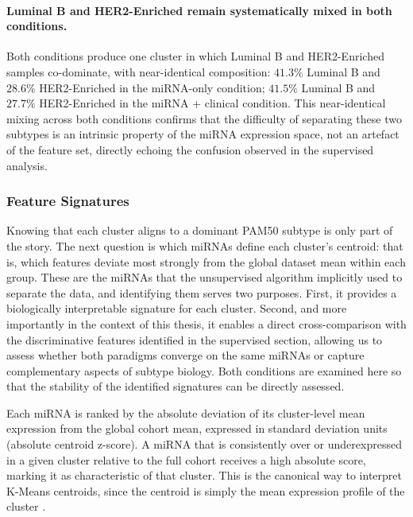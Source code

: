 \paragraph{Luminal B and HER2-Enriched remain systematically mixed in both conditions.}
Both conditions produce one cluster in which Luminal B and HER2-Enriched samples
co-dominate, with near-identical composition: $41.3\%$ Luminal B and $28.6\%$
HER2-Enriched in the miRNA-only condition; $41.5\%$ Luminal B and $27.7\%$
HER2-Enriched in the miRNA + clinical condition. This near-identical mixing across
both conditions confirms that the difficulty of separating these two subtypes is an
intrinsic property of the miRNA expression space, not an artefact of the feature set,
directly echoing the confusion observed in the supervised analysis.

\subsubsection{Feature Signatures}
\label{sec_unsupervised_importance}

Knowing that each cluster aligns to a dominant PAM50 subtype is only part of the story.
The next question is which miRNAs define each cluster's centroid: that is, which features
deviate most strongly from the global dataset mean within each group. These are the
miRNAs that the unsupervised algorithm implicitly used to separate the data, and
identifying them serves two purposes. First, it provides a biologically interpretable
signature for each cluster. Second, and more importantly in the context of this thesis,
it enables a direct cross-comparison with the discriminative features identified in the
supervised section, allowing us to assess whether both paradigms converge on the same
miRNAs or capture complementary aspects of subtype biology. Both conditions are examined
here so that the stability of the identified signatures can be directly assessed.

Each miRNA is ranked by the absolute deviation of its cluster-level mean expression
from the global cohort mean, expressed in standard deviation units (absolute centroid
z-score). A miRNA that is consistently over or underexpressed in a given cluster
relative to the full cohort receives a high absolute score, marking it as characteristic
of that cluster. This is the canonical way to interpret K-Means centroids, since the
centroid is simply the mean expression profile of the cluster \cite{hastie2009elements}.

